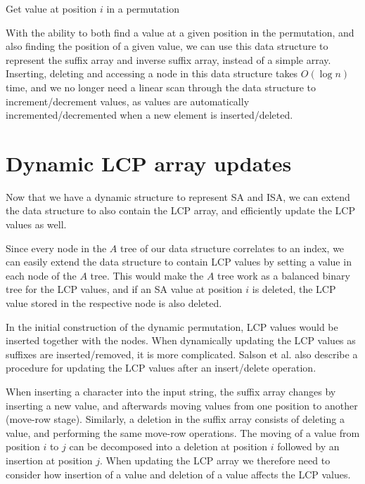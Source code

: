 \begin{algorithm}[t]
  \SetAlgoLined\DontPrintSemicolon

  \vspace{0.5cm}
  \caption{Get value at position $i$ in a permutation}
  \label{alg:dynamicpermutationaccess}
\end{algorithm}

With the ability to both find a value at a given position in the permutation, and also
finding the position of a given value, we can use this data structure to represent the
suffix array and inverse suffix array, instead of a simple array. Inserting, deleting and
accessing a node in this data structure takes $O(\log n)$ time, and we no longer need a
linear scan through the data structure to increment/decrement values, as values are
automatically incremented/decremented when a new element is inserted/deleted.

\section{Dynamic LCP array updates}

Now that we have a dynamic structure to represent SA and ISA, we can extend the data
structure to also contain the LCP array, and efficiently update the LCP values as well.

Since every node in the $A$ tree of our data structure correlates to an index, we can
easily extend the data structure to contain LCP values by setting a value in each node of
the $A$ tree. This would make the $A$ tree work as a balanced binary tree for the LCP
values, and if an SA value at position $i$ is deleted, the LCP value stored in
the respective node is also deleted.

In the initial construction of the dynamic permutation, LCP values would be inserted
together with the nodes. When dynamically updating the LCP values as suffixes are
inserted/removed, it is more complicated. Salson et al.\cite{DynamicExtendedSuffixArrays}
also describe a procedure for updating the LCP values after an insert/delete operation.

When inserting a character into the input string, the suffix array changes by inserting a
new value, and afterwards moving values from one position to another (move-row stage).
Similarly, a deletion in the suffix array consists of deleting a value, and performing the
same move-row operations. The moving of a value from position $i$ to $j$ can be decomposed
into a deletion at position $i$ followed by an insertion at position $j$. When updating
the LCP array we therefore need to consider how insertion of a value and deletion of a
value affects the LCP values.

